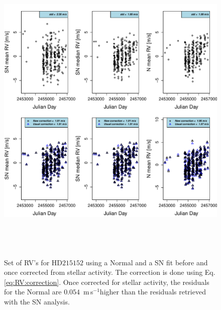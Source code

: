 \documentclass{aa}
\def\ms{\hbox{\,m\,s$^{-1}$}}         %
\begin{document}
\begin{figure} 
   \centering
\includegraphics[height = 6in]{NEW_CORRECTIONHD21515_[3]CorrectionActivity_RadialVelocity_vs_time.pdf} 
   \caption{Set of RV's for $\text{HD}215152$ using a Normal and a SN fit before and once corrected from stellar activity. The correction is done using Eq. \ref{eq:RV:correction}. Once corrected for stellar activity, the residuals for the Normal are $0.054$ \ms higher than the residuals retrieved with the SN analysis.}
   \label{fig:HD215152:correctionRV}
\end{figure}
\end{document}
